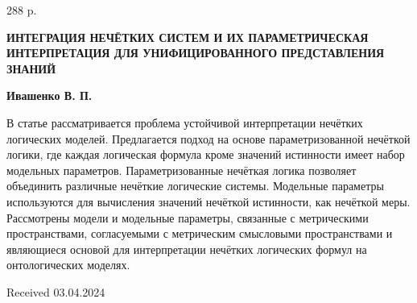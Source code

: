 \documentclass{article}
\begin{document}
\begin{multicols}{2}
\begin{enumerate}[label={[\arabic*]},itemsep=0pt, leftmargin=2em, labelsep=1em,topsep=0pt]
288 p.
\end{enumerate}
\begin{center}
\noindent
\large
\textbf{ИНТЕГРАЦИЯ НЕЧЁТКИХ СИСТЕМ И
ИХ ПАРАМЕТРИЧЕСКАЯ
ИНТЕРПРЕТАЦИЯ ДЛЯ
УНИФИЦИРОВАННОГО
ПРЕДСТАВЛЕНИЯ ЗНАНИЙ}
\end{center}
\begin{center}\large\textbf{
  Ивашенко В. П.  }
\end{center}
\normalsize
В статье рассматривается проблема устойчивой интерпретации нечётких логических моделей. Предлагается подход на основе параметризованной нечёткой
логики, где каждая логическая формула кроме значений истинности имеет набор модельных параметров. Параметризованные нечёткая логика позволяет
объединить различные нечёткие логические системы.
Модельные параметры используются для вычисления
значений нечёткой истинности, как нечёткой меры.
Рассмотрены модели и модельные параметры, связанные с метрическими пространствами, согласуемыми с
метрическим смысловыми пространствами и являющиеся основой для интерпретации нечётких логических формул на онтологических моделях.\par
\begin{flushright}
Received 03.04.2024
\end{flushright}
\newpage
\end{multicols}
\end{document}
